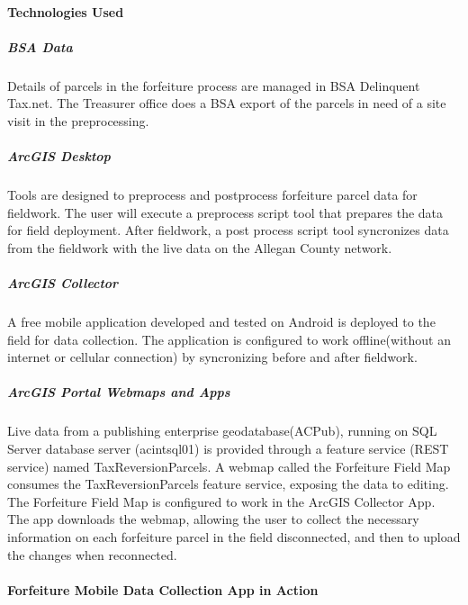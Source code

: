 \documentclass[class=article , crop=false, titlepage, twoside, multi={itemize, figure, verbatim}, float=false]{standalone}
\begin{document}
\medskip \paragraph{Technologies Used}
\subparagraph{BSA Data}Details of parcels in the forfeiture process are managed in BSA Delinquent Tax.net.  The Treasurer office does a BSA export of the parcels in need of a site visit in the preprocessing.

\subparagraph{ArcGIS Desktop}Tools are designed to preprocess and postprocess forfeiture parcel data for fieldwork.  The user will execute a preprocess script tool that prepares the data for field deployment.  After fieldwork, a post process script tool syncronizes data from the fieldwork with the live data on the Allegan County network. 

\subparagraph{ArcGIS Collector}A free mobile application developed and tested on Android is deployed to the field for data collection.  The application is configured to work offline(without an internet or cellular connection) by syncronizing before and after fieldwork.

\subparagraph{ArcGIS Portal Webmaps and Apps}Live data from a publishing enterprise geodatabase(ACPub), running on SQL Server database server (acintsql01) is provided through a feature service (REST service)  named TaxReversionParcels.  A webmap called the Forfeiture Field Map consumes the TaxReversionParcels feature service, exposing the data to editing.  The Forfeiture Field Map is configured to work in the ArcGIS Collector App.  The app downloads the webmap, allowing the user to collect the necessary information on each forfeiture parcel in the field disconnected, and then to upload the changes when reconnected. 

\paragraph{Forfeiture Mobile Data Collection App in Action}
\end{document}
